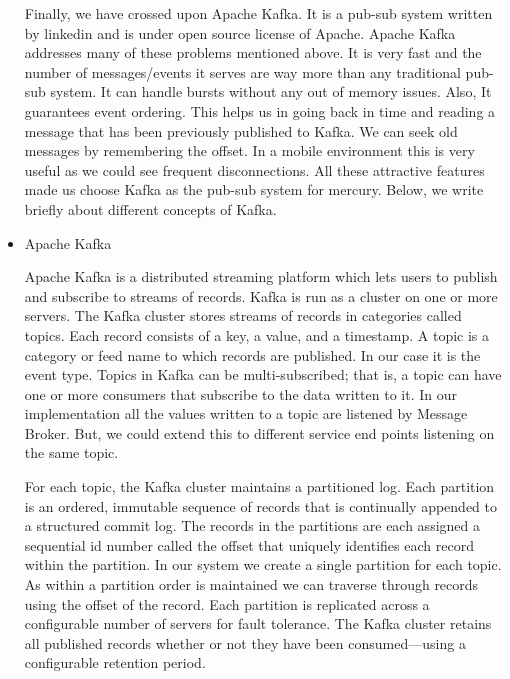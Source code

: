 \begin{itemize}
Finally, we have crossed upon Apache Kafka. It is a pub-sub system written by 
linkedin and is under open source license of Apache. Apache Kafka addresses many
of these problems mentioned above. It is very fast and the number of 
messages/events it serves are way more than any traditional pub-sub system. 
It can handle bursts without any out of memory issues. Also, It guarantees 
event ordering. This helps us in going back in time and reading a message that
has been previously published to Kafka. We can seek old messages by remembering 
the offset. In a mobile environment this is very useful as we could see frequent
disconnections. All these attractive features made us choose Kafka as the 
pub-sub system for mercury. Below, we write briefly about different concepts of 
Kafka.

\item Apache Kafka

Apache Kafka is a distributed streaming platform which lets users to publish and
subscribe to streams of records. Kafka is run as a cluster on one or more 
servers. The Kafka cluster stores streams of records in categories called topics.
Each record consists of a key, a value, and a timestamp. A topic is a category 
or feed name to which records are published. In our case it is the event type.
Topics in Kafka can be multi-subscribed; that is, a topic can have one or more 
consumers that subscribe to the data written to it. In our implementation
all the values written to a topic are listened by Message Broker. But, we could
extend this to different service end points listening on the same topic.

For each topic, the Kafka cluster maintains a partitioned log. Each partition 
is an ordered, immutable sequence of records that is continually appended to a 
structured commit log. The records in the partitions are each assigned a 
sequential id number called the offset that uniquely identifies each record 
within the partition. In our system we create a single partition for each topic.
As within a partition order is maintained we can traverse through records using
the offset of the record. Each partition is replicated across a configurable
number of servers for fault tolerance. The Kafka cluster retains all published 
records whether or not they have been consumed—using a configurable retention 
period.  


\end{itemize}
